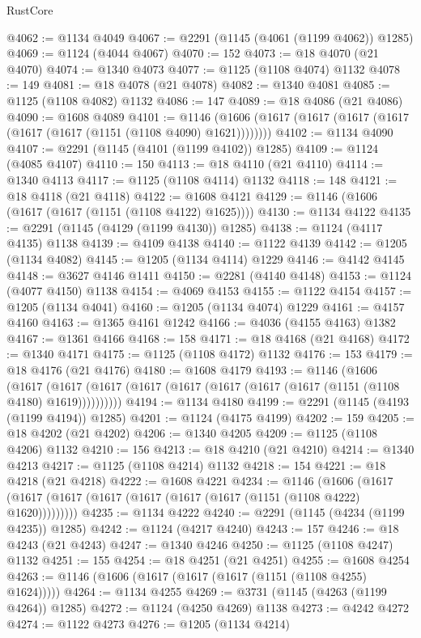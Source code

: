 \begin{lexlean}{RustCore}
\begin{coremodule}
@4062 := @1134 @4049
@4067 := @2291 (@1145 (@4061 (@1199 @4062)) @1285)
@4069 := @1124 (@4044 @4067)
@4070 := 152
@4073 := @18 @4070 (@21 @4070)
@4074 := @1340 @4073
@4077 := @1125 (@1108 @4074) @1132
@4078 := 149
@4081 := @18 @4078 (@21 @4078)
@4082 := @1340 @4081
@4085 := @1125 (@1108 @4082) @1132
@4086 := 147
@4089 := @18 @4086 (@21 @4086)
@4090 := @1608 @4089
@4101 := @1146 (@1606 (@1617 (@1617 (@1617 (@1617 (@1617 (@1617 (@1151 (@1108 @4090) @1621))))))))
@4102 := @1134 @4090
@4107 := @2291 (@1145 (@4101 (@1199 @4102)) @1285)
@4109 := @1124 (@4085 @4107)
@4110 := 150
@4113 := @18 @4110 (@21 @4110)
@4114 := @1340 @4113
@4117 := @1125 (@1108 @4114) @1132
@4118 := 148
@4121 := @18 @4118 (@21 @4118)
@4122 := @1608 @4121
@4129 := @1146 (@1606 (@1617 (@1617 (@1151 (@1108 @4122) @1625))))
@4130 := @1134 @4122
@4135 := @2291 (@1145 (@4129 (@1199 @4130)) @1285)
@4138 := @1124 (@4117 @4135) @1138
@4139 := @4109 @4138
@4140 := @1122 @4139
@4142 := @1205 (@1134 @4082)
@4145 := @1205 (@1134 @4114) @1229
@4146 := @4142 @4145
@4148 := @3627 @4146 @1411
@4150 := @2281 (@4140 @4148)
@4153 := @1124 (@4077 @4150) @1138
@4154 := @4069 @4153
@4155 := @1122 @4154
@4157 := @1205 (@1134 @4041)
@4160 := @1205 (@1134 @4074) @1229
@4161 := @4157 @4160
@4163 := @1365 @4161 @1242
@4166 := @4036 (@4155 @4163) @1382
@4167 := @1361 @4166
@4168 := 158
@4171 := @18 @4168 (@21 @4168)
@4172 := @1340 @4171
@4175 := @1125 (@1108 @4172) @1132
@4176 := 153
@4179 := @18 @4176 (@21 @4176)
@4180 := @1608 @4179
@4193 := @1146
    (@1606
      (@1617 (@1617 (@1617 (@1617 (@1617 (@1617 (@1617 (@1617 (@1151 (@1108 @4180) @1619))))))))))
@4194 := @1134 @4180
@4199 := @2291 (@1145 (@4193 (@1199 @4194)) @1285)
@4201 := @1124 (@4175 @4199)
@4202 := 159
@4205 := @18 @4202 (@21 @4202)
@4206 := @1340 @4205
@4209 := @1125 (@1108 @4206) @1132
@4210 := 156
@4213 := @18 @4210 (@21 @4210)
@4214 := @1340 @4213
@4217 := @1125 (@1108 @4214) @1132
@4218 := 154
@4221 := @18 @4218 (@21 @4218)
@4222 := @1608 @4221
@4234 := @1146
    (@1606 (@1617 (@1617 (@1617 (@1617 (@1617 (@1617 (@1617 (@1151 (@1108 @4222) @1620)))))))))
@4235 := @1134 @4222
@4240 := @2291 (@1145 (@4234 (@1199 @4235)) @1285)
@4242 := @1124 (@4217 @4240)
@4243 := 157
@4246 := @18 @4243 (@21 @4243)
@4247 := @1340 @4246
@4250 := @1125 (@1108 @4247) @1132
@4251 := 155
@4254 := @18 @4251 (@21 @4251)
@4255 := @1608 @4254
@4263 := @1146 (@1606 (@1617 (@1617 (@1617 (@1151 (@1108 @4255) @1624)))))
@4264 := @1134 @4255
@4269 := @3731 (@1145 (@4263 (@1199 @4264)) @1285)
@4272 := @1124 (@4250 @4269) @1138
@4273 := @4242 @4272
@4274 := @1122 @4273
@4276 := @1205 (@1134 @4214)

\end{coremodule}
\end{lexlean}

